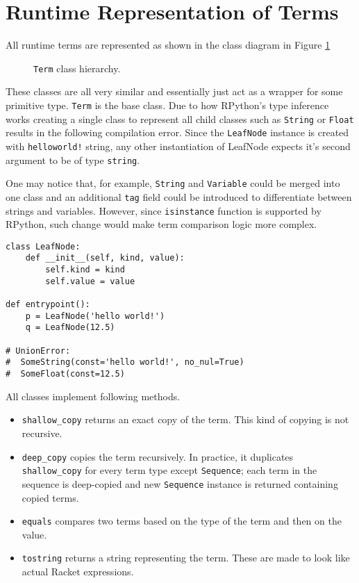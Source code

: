 \section{Runtime Representation of Terms}
\label{section:runtime-terms}

All runtime terms are represented as shown in the class diagram in Figure \ref{class-diagram-runtime-term}

\begin{figure}[H]
	\centering
\caption{\texttt{Term} class hierarchy.}
\label{class-diagram-runtime-term}
\end{figure}

These classes are all very similar and essentially just act as a wrapper for some primitive type. \texttt{Term} is the base class. Due to how RPython's type inference works creating a single class to represent all child classes such as \texttt{String} or \texttt{Float} results in the following compilation error.  Since the \texttt{LeafNode} instance is created with \texttt{helloworld!} string, any other instantiation of LeafNode expects it's second argument to be of type \texttt{string}. 

One may notice that, for example, \texttt{String} and \texttt{Variable} could be merged into one class and an additional \texttt{tag} field could be introduced to differentiate between strings and variables. However, since \texttt{isinstance} function is supported by RPython, such change would make term comparison logic more complex.

\begin{verbatim}
class LeafNode:
    def __init__(self, kind, value):
        self.kind = kind 
        self.value = value

def entrypoint():
    p = LeafNode('hello world!')
    q = LeafNode(12.5)

# UnionError:
#  SomeString(const='hello world!', no_nul=True)
#  SomeFloat(const=12.5)
\end{verbatim}

All classes implement following methods.
\begin{itemize}
\item \texttt{shallow\_copy} returns an exact copy of the term. This kind of copying is not recursive.
\item
\texttt{deep\_copy} copies the term recursively. In practice, it duplicates \texttt{shallow\_copy} for every term type except \texttt{Sequence}; each term in the sequence is deep-copied and new \texttt{Sequence} instance is returned containing copied terms.
\item
\texttt{equals} compares two terms based on the type of the term and then on the value.
\item
\texttt{tostring} returns a string representing the term. These are made to look like actual Racket expressions.
\end{itemize}
 
